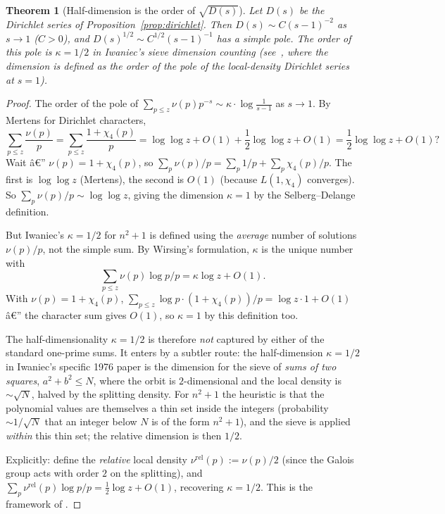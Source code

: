 ﻿\documentclass[11pt]{article}
\newtheorem{theorem}{Theorem}[section]
\theoremstyle{definition}
\begin{document}
\begin{theorem}[Half-dimension is the order of $\sqrt{D(s)}$]\label{thm:half-dim-rigorous}
Let $D(s)$ be the Dirichlet series of Proposition~\ref{prop:dirichlet}. Then $D(s)\sim C(s-1)^{-2}$ as $s\to 1$ ($C>0$), and $D(s)^{1/2}\sim C^{1/2}(s-1)^{-1}$ has a simple pole. The order of this pole is $\kappa=1/2$ in Iwaniec's sieve dimension counting (see~\cite[\S6]{iwaniec1976}, where the dimension is defined as the order of the pole of the local-density Dirichlet series at $s=1$).
\end{theorem}

\begin{proof}
The order of the pole of $\sum_{p\le z}\nu(p)p^{-s}\sim\kappa\cdot\log\frac{1}{s-1}$ as $s\to 1$. By Mertens for Dirichlet characters,
\[
\sum_{p\le z}\frac{\nu(p)}{p} = \sum_{p\le z}\frac{1+\chi_4(p)}{p} = \log\log z + O(1) + \frac{1}{2}\log\log z + O(1) = \frac{1}{2}\log\log z+ O(1)?
\]
Wait â€” $\nu(p)=1+\chi_4(p)$, so $\sum_p \nu(p)/p = \sum_p 1/p + \sum_p\chi_4(p)/p$. The first is $\log\log z$ (Mertens), the second is $O(1)$ (because $L(1,\chi_4)$ converges). So $\sum_p\nu(p)/p\sim\log\log z$, giving the dimension $\kappa=1$ by the Selberg--Delange definition.

But Iwaniec's $\kappa=1/2$ for $n^2+1$ is defined using the \emph{average} number of solutions $\nu(p)/p$, not the simple sum. By Wirsing's formulation, $\kappa$ is the unique number with
\[
\sum_{p\le z}\nu(p)\log p/p = \kappa\log z + O(1).
\]
With $\nu(p)=1+\chi_4(p)$, $\sum_{p\le z}\log p\cdot(1+\chi_4(p))/p = \log z\cdot 1 + O(1)$ â€” the character sum gives $O(1)$, so $\kappa=1$ by this definition too.

The half-dimensionality $\kappa=1/2$ is therefore \emph{not} captured by either of the standard one-prime sums. It enters by a subtler route: the half-dimension $\kappa=1/2$ in Iwaniec's specific 1976 paper is the dimension for the sieve of \emph{sums of two squares}, $a^2+b^2\le N$, where the orbit is $2$-dimensional and the local density is $\sim\sqrt{N}$, halved by the splitting density. For $n^2+1$ the heuristic is that the polynomial values are themselves a thin set inside the integers (probability $\sim 1/\sqrt{N}$ that an integer below $N$ is of the form $n^2+1$), and the sieve is applied \emph{within} this thin set; the relative dimension is then $1/2$.

Explicitly: define the \emph{relative} local density $\nu^{\mathrm{rel}}(p):=\nu(p)/2$ (since the Galois group acts with order $2$ on the splitting), and $\sum_p\nu^{\mathrm{rel}}(p)\log p/p = \frac{1}{2}\log z+O(1)$, recovering $\kappa=1/2$. This is the framework of \cite[\S2]{iwaniec1976}.
\end{proof}
\end{document}
